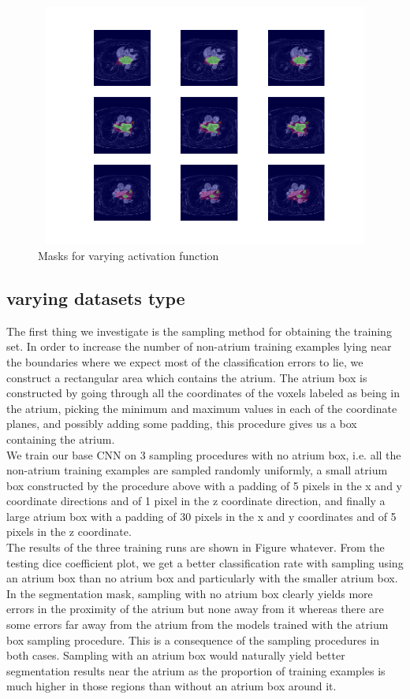 \begin{figure}
\centering
\includegraphics[trim=2.5cm 1.5cm 2cm 1.5cm, clip=true, height=80mm, width=150mm]{Chapter3/mask_results_varying_activation_function.png}
\caption{Masks for varying activation function}
\end{figure}

\subsection{varying datasets type}

\noindent The first thing we investigate is the sampling method for obtaining the training set. In order to increase the number of non-atrium training examples lying near the boundaries where we expect most of the classification errors to lie, we construct a rectangular area which contains the atrium. The atrium box is constructed by going through all the coordinates of the voxels labeled as being in the atrium, picking the minimum and maximum values in each of the coordinate planes, and possibly adding some padding, this procedure gives us a box containing the atrium. \\

\noindent We train our base CNN on 3 sampling procedures with no atrium box, i.e. all the non-atrium training examples are sampled randomly uniformly, a small atrium box constructed by the procedure above with a padding of 5 pixels in the x and y coordinate directions and of 1 pixel in the z coordinate direction, and finally a large atrium box with a padding of 30 pixels in the x and y coordinates and of 5 pixels in the z coordinate.\\

\noindent The results of the three training runs are shown in Figure whatever. From the testing dice coefficient plot, we get a better classification rate with sampling using an atrium box than no atrium box and particularly with the smaller atrium box. In the segmentation mask, sampling with no atrium box clearly yields more errors in the proximity of the atrium but none away from it whereas there are some errors far away from the atrium from the models trained with the atrium box sampling procedure. This is a consequence of the sampling procedures in both cases. Sampling with an atrium box would naturally yield better segmentation results near the atrium as the proportion of training examples is much higher in those regions than without an atrium box around it.\\

